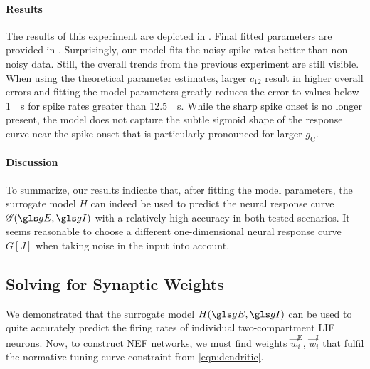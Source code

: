\paragraph{Results}
The results of this experiment are depicted in .
Final fitted parameters are provided in .
Surprisingly, our model fits the noisy spike rates better than non-noisy data.
Still, the overall trends from the previous experiment are still visible.
When using the theoretical parameter estimates, larger $c_{12}$ result in higher overall errors and fitting the model parameters greatly reduces the error to values below \SI{1}{\per\second} for spike rates greater than \SI{12.5}{\per\second}.
While the sharp spike onset is no longer present, the model does not capture the subtle sigmoid shape of the response curve near the spike onset that is particularly pronounced for larger $g_\mathrm{C}$.

\paragraph{Discussion}
To summarize, our results indicate that, after fitting the model parameters, the surrogate model $H$ can indeed be used to predict the neural response curve $\mathscr{G}(\gE, \gI)$ with a relatively high accuracy in both tested scenarios.
It seems reasonable to choose a different one-dimensional neural response curve $G[J]$ when taking noise in the input into account.


\subsection{Solving for Synaptic Weights}

We demonstrated that the surrogate model $H(\gE, \gI)$ can be used to quite accurately predict the firing rates of individual two-compartment LIF neurons.
Now, to construct NEF networks, we must find weights $\vec w^\mathrm{E}_i$, $\vec w^\mathrm{I}_i$ that fulfil the normative tuning-curve constraint from \cref{eqn:dendritic}.

